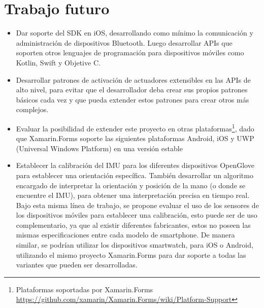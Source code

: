 \section{Trabajo futuro}

\begin{itemize}
	
	\item Dar soporte del SDK en iOS, desarrollando como mínimo la comunicación y administración de dispositivos Bluetooth. Luego desarrollar APIs que soporten otros lenguajes de programación para dispositivos móviles como Kotlin, Swift y Objetive C.
	
	\item Desarrollar patrones de activación de actuadores extensibles en las APIs de alto nivel, para evitar que el desarrollador deba crear sus propios patrones básicos cada vez y que pueda extender estos patrones para crear otros más complejos.
	
	
	\item Evaluar la posibilidad de extender este proyecto en otras plataformas\footnote{Plataformas soportadas por Xamarin.Forms \url{https://github.com/xamarin/Xamarin.Forms/wiki/Platform-Support}}, dado que Xamarin.Forms soporte las siguientes plataformas Android, iOS y UWP (Universal Windows Platform) en una versión estable
	
	\item Establecer la calibración  del IMU para los diferentes dispositivos OpenGlove para establecer una orientación específica. También desarrollar un algoritmo encargado de interpretar la orientación y posición de la mano (o donde se encuentre el IMU), para obtener una interpretación precisa en tiempo real. Bajo esta misma línea de trabajo, se propone evaluar el uso de los sensores de los dispositivos móviles para establecer una calibración, esto puede ser de uso complementario, ya que al existir diferentes fabricantes, estos no poseen las mismas especificaciones entre cada modelo de smartphone. De manera similar, se podrían utilizar los dispositivos smartwatch, para iOS o Android, utilizando el mismo proyecto Xamarin.Forms para dar soporte a todas las variantes que pueden ser desarrolladas.
	

\end{itemize}
